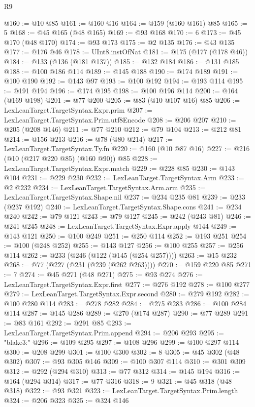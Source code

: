 \begin{lexlean}{R9}
\begin{coremodule}
{{{{{{{{{{{{{{{{{{{{{{{{{{{{{{{{{{{{{{{{{{{{{{{{{{{{{{{{{{{{{{{{{{{{{{{{{{{{{{{{{{{{{{{{{{{{{{{{{{{{{{{{{{{{@160 := @10 @85
@161 := @160 @16
@164 := @159 (@160 @161) @85
@165 := 5
@168 := @45 @165 (@48 @165)
@169 := @93 @168
@170 := 6
@173 := @45 @170 (@48 @170)
@174 := @93 @173
@175 := @2 @135
@176 := @43 @135
@177 := @176 @46
@178 := UInt8.instOfNat
@181 := @175 (@177 (@178 @46))
@184 := @133 (@136 (@181 @137))
@185 := @132 @184
@186 := @131 @185
@188 := @100 @186 @114
@189 := @145 @188
@190 := @174 @189
@191 := @100 @190
@192 := @143 @97
@193 := @100 @192
@194 := @193 @114
@195 := @191 @194
@196 := @174 @195
@198 := @100 @196 @114
@200 := @164 (@169 @198)
@201 := @77 @200
@205 := @83 (@10 @107 @16) @85
@206 := LexLeanTarget.TargetSyntax.Expr.prim
@207 := LexLeanTarget.TargetSyntax.Prim.utf8Encode
@208 := @206 @207
@210 := @205 (@208 @146)
@211 := @77 @210
@212 := @79 @104
@213 := @212 @81
@214 := @156 @213
@216 := @78 (@80 @214)
@217 := LexLeanTarget.TargetSyntax.Ty.fn
@220 := @160 (@10 @87 @16)
@227 := @216 (@10 (@217 @220 @85) (@160 @90)) @85
@228 := LexLeanTarget.TargetSyntax.Expr.match
@229 := @228 @85
@230 := @143 @104
@231 := @229 @230
@232 := LexLeanTarget.TargetSyntax.Arm
@233 := @2 @232
@234 := LexLeanTarget.TargetSyntax.Arm.arm
@235 := LexLeanTarget.TargetSyntax.Shape.nil
@237 := @234 @235 @81
@239 := @233 (@237 @192)
@240 := LexLeanTarget.TargetSyntax.Shape.cons
@241 := @234 @240
@242 := @79 @121
@243 := @79 @127
@245 := @242 (@243 @81)
@246 := @241 @245
@248 := LexLeanTarget.TargetSyntax.Expr.apply @144
@249 := @143 @121
@250 := @100 @249
@251 := @250 @114
@252 := @193 @251
@254 := @100 (@248 @252)
@255 := @143 @127
@256 := @100 @255
@257 := @256 @114
@262 := @233 (@246 (@122 (@145 (@254 @257))))
@263 := @15 @232
@268 := @77 (@227 (@231 (@239 (@262 @263))))
@270 := @159 @220 @85
@271 := 7
@274 := @45 @271 (@48 @271)
@275 := @93 @274
@276 := LexLeanTarget.TargetSyntax.Expr.first
@277 := @276 @192
@278 := @100 @277
@279 := LexLeanTarget.TargetSyntax.Expr.second
@280 := @279 @192
@282 := @100 @280 @114
@283 := @278 @282
@284 := @275 @283
@286 := @100 @284 @114
@287 := @145 @286
@289 := @270 (@174 @287)
@290 := @77 @289
@291 := @83 @161
@292 := @291 @85
@293 := LexLeanTarget.TargetSyntax.Prim.append
@294 := @206 @293
@295 := "blake3:"
@296 := @109 @295
@297 := @108 @296
@299 := @100 @297 @114
@300 := @208 @299
@301 := @100 @300
@302 := 8
@305 := @45 @302 (@48 @302)
@307 := @93 @305 @146
@309 := @100 @307 @114
@310 := @301 @309
@312 := @292 (@294 @310)
@313 := @77 @312
@314 := @145 @194
@316 := @164 (@294 @314)
@317 := @77 @316
@318 := 9
@321 := @45 @318 (@48 @318)
@322 := @93 @321
@323 := LexLeanTarget.TargetSyntax.Prim.length
@324 := @206 @323
@325 := @324 @146
}}}}}}}}}}}}}}}}}}}}}}}}}}}}}}}}}}}}}}}}}}}}}}}}}}}}}}}}}}}}}}}}}}}}}}}}}}}}}}}}}}}}}}}}}}}}}}}}}}}}}}}}}}}}
\end{coremodule}
\end{lexlean}
